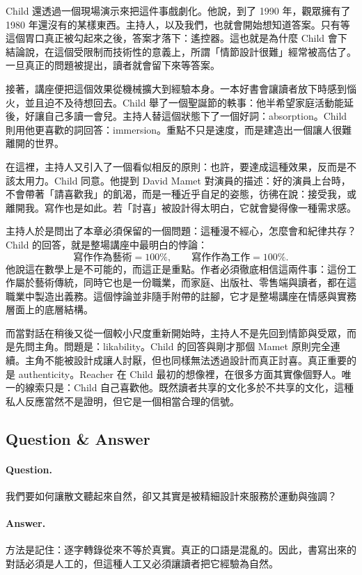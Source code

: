 Child 還透過一個現場演示來把這件事戲劇化。他說，到了 1990 年，觀眾擁有了 1980 年還沒有的某樣東西。主持人，以及我們，也就會開始想知道答案。只有等這個胃口真正被勾起來之後，答案才落下：遙控器。這也就是為什麼 Child 會下結論說，在這個受限制而技術性的意義上，所謂「情節設計很難」經常被高估了。一旦真正的問題被提出，讀者就會留下來等答案。

接著，講座便把這個效果從機械擴大到經驗本身。一本好書會讓讀者放下時感到惱火，並且迫不及待想回去。Child 舉了一個聖誕節的軼事：他半希望家庭活動能延後，好讓自己多讀一會兒。主持人替這個狀態下了一個好詞：absorption。Child 則用他更喜歡的詞回答：immersion。重點不只是速度，而是建造出一個讓人很難離開的世界。

在這裡，主持人又引入了一個看似相反的原則：也許，要達成這種效果，反而是不該太用力。Child 同意。他提到 David Mamet 對演員的描述：好的演員上台時，不會帶著「請喜歡我」的飢渴，而是一種近乎自足的姿態，彷彿在說：接受我，或離開我。寫作也是如此。若「討喜」被設計得太明白，它就會變得像一種需求感。

主持人於是問出了本章必須保留的一個問題：這種漫不經心，怎麼會和紀律共存？Child 的回答，就是整場講座中最明白的悖論：
\begin{equation}
\text{寫作作為藝術} = 100\%, \qquad
\text{寫作作為工作} = 100\%.
\end{equation}
他說這在數學上是不可能的，而這正是重點。作者必須徹底相信這兩件事：這份工作屬於藝術傳統，同時它也是一份職業，而家庭、出版社、零售端與讀者，都在這職業中製造出義務。這個悖論並非隨手附帶的註腳，它才是整場講座在情感與實務層面上的底層結構。

而當對話在稍後又從一個較小尺度重新開始時，主持人不是先回到情節與受眾，而是先問主角。問題是：likability。Child 的回答與剛才那個 Mamet 原則完全連續。主角不能被設計成讓人討厭，但也同樣無法透過設計而真正討喜。真正重要的是 authenticity。Reacher 在 Child 最初的想像裡，在很多方面其實像個野人。唯一的線索只是：Child 自己喜歡他。既然讀者共享的文化多於不共享的文化，這種私人反應當然不是證明，但它是一個相當合理的信號。

\subsection{Question \& Answer}

\paragraph{Question.} 我們要如何讓散文聽起來自然，卻又其實是被精細設計來服務於運動與強調？

\paragraph{Answer.} 方法是記住：逐字轉錄從來不等於真實。真正的口語是混亂的。因此，書寫出來的對話必須是人工的，但這種人工又必須讓讀者把它經驗為自然。

